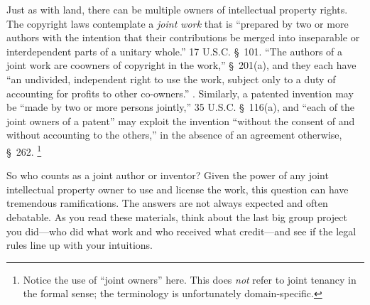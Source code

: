 
Just as with land, there can be multiple owners of intellectual property
rights. The copyright laws contemplate a \emph{joint work} that is ``prepared by
two or more authors with the intention that their contributions be merged into
inseparable or interdependent parts of a unitary whole.'' 17 U.S.C. \S~101.
``The authors of a joint work are coowners of copyright in the work,''
\S~201(a), and they each have ``an undivided, independent right to use the work,
subject only to a duty of accounting for profits to other co-owners.''
. Similarly, a
patented invention may be ``made by two or more persons jointly,'' 35 U.S.C.
\S~116(a), and ``each of the joint owners of a patent'' may exploit the
invention ``without the consent of and without accounting to the others,'' in
the absence of an agreement otherwise, \S~262. \footnote{Notice the use of
``joint owners'' here. This does \emph{not} refer to joint tenancy in the
formal sense; the terminology is unfortunately domain-specific.}

So who counts as a joint author or inventor? Given the power of any joint
intellectual property owner to use and license the work, this question can have
tremendous ramifications. The answers are not always expected and often
debatable. As you read these materials, think about the last big group project
you did---who did what work and who received what credit---and see if the legal
rules line up with your intuitions.



